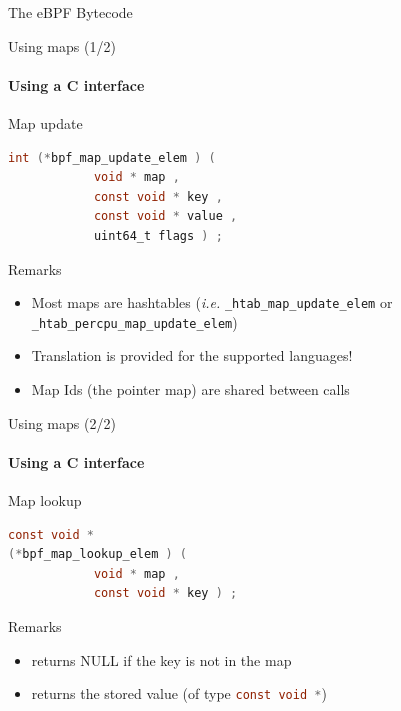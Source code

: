 \begin{reveals}
\begin{frame}[c]{The eBPF Bytecode}
\end{frame}

\begin{frame}[c,fragile]{Using maps (1/2)}
  \framesubtitle{Using a C interface}
  
  \begin{block}{Map update}
\begin{lstlisting}[language=C]
int (*bpf_map_update_elem ) ( 
            void * map ,
            const void * key ,
            const void * value ,
            uint64_t flags ) ;
\end{lstlisting}
  \end{block}

  \vfill

  \begin{block}{Remarks}
    \begin{itemize}
    \item Most maps are hashtables (\textit{i.e.}
      \lstinline[language=C]|_htab_map_update_elem| or
      \lstinline[language=C]|_htab_percpu_map_update_elem|)
    \item Translation is provided for the supported languages!
    \item Map Ids (the pointer map) are shared between calls 
    \end{itemize}
  \end{block}

\end{frame}

\begin{frame}[c,fragile]{Using maps (2/2)}
  \framesubtitle{Using a C interface}
  
  \begin{block}{Map lookup}
\begin{lstlisting}[language=C]
const void * 
(*bpf_map_lookup_elem ) ( 
            void * map ,
            const void * key ) ;
    \end{lstlisting}
  \end{block}

  \vfill

  \begin{block}{Remarks}
    \begin{itemize}
    \item returns NULL if the key is not in the map
    \item returns the stored value (of type \lstinline[language=C]|const void *|)
    \end{itemize}
  \end{block}


\end{frame}
\end{reveals}
